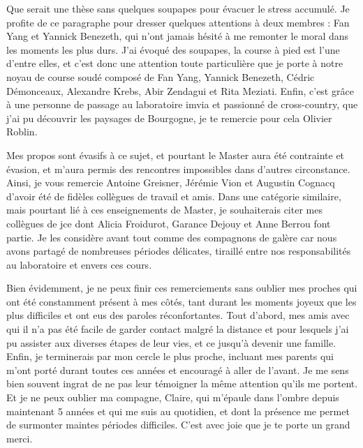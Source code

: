 \documentclass[english,standardlists]{spimubphdthesis}
\begin{document}
Que serait une thèse sans quelques soupapes pour évacuer le stress accumulé. Je profite de ce paragraphe pour dresser quelques attentions à deux membres : Fan Yang et Yannick Benezeth, qui n'ont jamais hésité à me remonter le moral dans les moments les plus durs. J'ai évoqué des soupapes, la course à pied est l'une d'entre elles, et c'est donc une attention toute particulière que je porte à notre noyau de course soudé composé de Fan Yang, Yannick Benezeth, Cédric Démonceaux, Alexandre Krebs, Abir Zendagui et Rita Meziati. Enfin, c'est grâce à une personne de passage au laboratoire \gls{imvia} et passionné de cross-country, que j'ai pu découvrir les paysages de Bourgogne, je te remercie pour cela Olivier Roblin.\par

Mes propos sont évasifs à ce sujet, et pourtant le Master aura été contrainte et évasion, et m'aura permis des rencontres impossibles dans d'autres circonstance. Ainsi, je vous remercie Antoine Greisner, Jérémie Vion et Augustin Cognacq d'avoir été de fidèles collègues de travail et amis. Dans une catégorie similaire, mais pourtant lié à ces enseignements de Master, je souhaiterais citer mes collègues de \gls{jce} dont Alicia Froidurot, Garance Dejouy et Anne Berrou font partie. Je les considère avant tout comme des compagnons de galère car nous avons partagé de nombreuses périodes délicates, tiraillé entre nos responsabilités au laboratoire et envers ces cours.\par
 
Bien évidemment, je ne peux finir ces remerciements sans oublier mes proches qui ont été constamment présent à mes côtés, tant durant les moments joyeux que les plus difficiles et ont eus des paroles réconfortantes. Tout d'abord, mes amis avec qui il n'a pas été facile de garder contact malgré la distance et pour lesquels j'ai pu assister aux diverses étapes de leur vies, et ce jusqu'à devenir une famille. Enfin, je terminerais par mon cercle le plus proche, incluant mes parents qui m'ont porté durant toutes ces années et encouragé à aller de l'avant. Je me sens bien souvent ingrat de ne pas leur témoigner la même attention qu'ils me portent. Et je ne peux oublier ma compagne, Claire, qui m'épaule dans l'ombre depuis maintenant 5 années et qui me suis au quotidien, et dont la présence me permet de surmonter maintes périodes difficiles. C'est avec joie que je te porte un grand merci.\par
		
\tableofcontents
\end{document}
